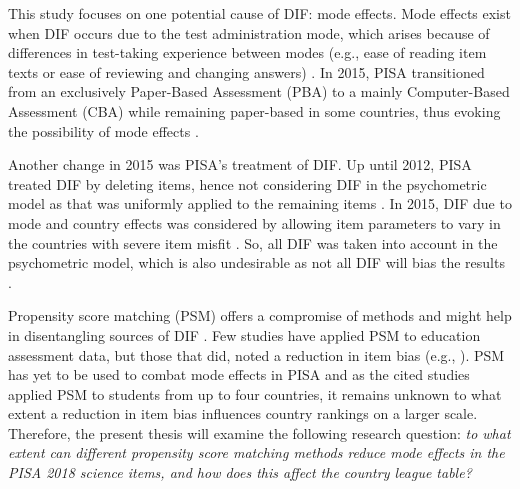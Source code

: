 \documentclass{article}
\begin{document}
This study focuses on one potential cause of DIF: mode effects. Mode effects exist when DIF occurs due to the test administration mode, which arises because of differences in test-taking experience between modes (e.g., ease of reading item texts or ease of reviewing and changing answers) \citep{kolen2014practical}. In 2015, PISA transitioned from an exclusively Paper-Based Assessment (PBA) to a mainly Computer-Based Assessment (CBA) while remaining paper-based in some countries, thus evoking the possibility of mode effects \citep{OECD2015}.

Another change in 2015 was PISA's treatment of DIF. Up until 2012, PISA treated DIF by deleting items, hence not considering DIF in the psychometric model as that was uniformly applied to the remaining items \citep{zwitser2017monitoring, OECD2012}. In 2015, DIF due to mode and country effects was considered by allowing item parameters to vary in the countries with severe item misfit \citep{feskens2019differential, OECD2015}. So, all DIF was taken into account in the psychometric model, which is also undesirable as not all DIF will bias the results \citep{zumbo2005matter, zwitser2017monitoring}. 


Propensity score matching (PSM) offers a compromise of methods and might help in disentangling sources of DIF \citep{liu2020investigating}. Few studies have applied PSM to education assessment data, but those that did, noted a reduction in item bias (e.g., \citet{arikan2018propensity, joldersma2010application, lee2014effect, wu2006using, seo2015comparability, puhan2005evaluating}). PSM has yet to be used to combat mode effects in PISA and as the cited studies applied PSM to students from up to four countries, it remains unknown to what extent a reduction in item bias influences country rankings on a larger scale. Therefore, the present thesis will examine the following research question: \textit{to what extent can different propensity score matching methods reduce mode effects in the PISA 2018 science items, and how does this affect the country league table?} 
\end{document}
